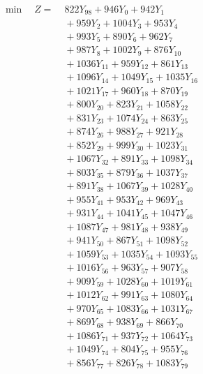 \documentclass[a4paper,10pt]{article}
\begin{document}
\allowdisplaybreaks
{\small
\begin{align}
\min \quad Z = &\; 822 Y_{98} + 946 Y_{0} + 942 Y_{1} \\[0.3ex]
&\;  + 959 Y_{2} + 1004 Y_{3} + 953 Y_{4} \\[0.3ex]
&\;  + 993 Y_{5} + 890 Y_{6} + 962 Y_{7} \\[0.3ex]
&\;  + 987 Y_{8} + 1002 Y_{9} + 876 Y_{10} \\[0.3ex]
&\;  + 1036 Y_{11} + 959 Y_{12} + 861 Y_{13} \\[0.3ex]
&\;  + 1096 Y_{14} + 1049 Y_{15} + 1035 Y_{16} \\[0.3ex]
&\;  + 1021 Y_{17} + 960 Y_{18} + 870 Y_{19} \\[0.3ex]
&\;  + 800 Y_{20} + 823 Y_{21} + 1058 Y_{22} \\[0.3ex]
&\;  + 831 Y_{23} + 1074 Y_{24} + 863 Y_{25} \\[0.3ex]
&\;  + 874 Y_{26} + 988 Y_{27} + 921 Y_{28} \\[0.5ex]\allowbreak
&\;  + 852 Y_{29} + 999 Y_{30} + 1023 Y_{31} \\[0.3ex]
&\;  + 1067 Y_{32} + 891 Y_{33} + 1098 Y_{34} \\[0.3ex]
&\;  + 803 Y_{35} + 879 Y_{36} + 1037 Y_{37} \\[0.3ex]
&\;  + 891 Y_{38} + 1067 Y_{39} + 1028 Y_{40} \\[0.3ex]
&\;  + 955 Y_{41} + 953 Y_{42} + 969 Y_{43} \\[0.3ex]
&\;  + 931 Y_{44} + 1041 Y_{45} + 1047 Y_{46} \\[0.3ex]
&\;  + 1087 Y_{47} + 981 Y_{48} + 938 Y_{49} \\[0.3ex]
&\;  + 941 Y_{50} + 867 Y_{51} + 1098 Y_{52} \\[0.3ex]
&\;  + 1059 Y_{53} + 1035 Y_{54} + 1093 Y_{55} \\[0.3ex]
&\;  + 1016 Y_{56} + 963 Y_{57} + 907 Y_{58} \\[0.5ex]\allowbreak
&\;  + 909 Y_{59} + 1028 Y_{60} + 1019 Y_{61} \\[0.3ex]
&\;  + 1012 Y_{62} + 991 Y_{63} + 1080 Y_{64} \\[0.3ex]
&\;  + 970 Y_{65} + 1083 Y_{66} + 1031 Y_{67} \\[0.3ex]
&\;  + 869 Y_{68} + 938 Y_{69} + 866 Y_{70} \\[0.3ex]
&\;  + 1086 Y_{71} + 937 Y_{72} + 1064 Y_{73} \\[0.3ex]
&\;  + 1049 Y_{74} + 804 Y_{75} + 955 Y_{76} \\[0.3ex]
&\;  + 856 Y_{77} + 826 Y_{78} + 1083 Y_{79} \\[0.3ex]

\end{align}}
\end{document}
